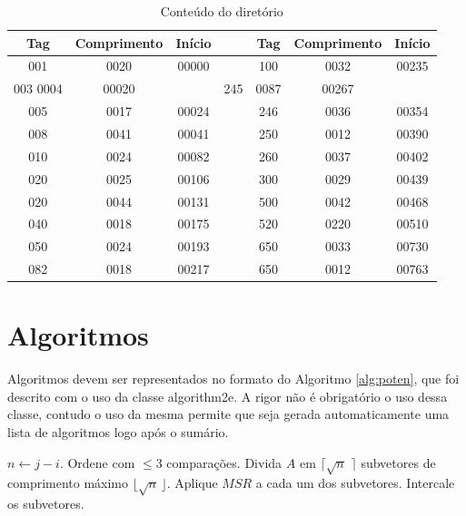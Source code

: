 \begin{table}[hp]
\centering
\caption{Conteúdo do diretório \cite{Mar2004} }
\label{tab:MarcMNem} 
\begin{tabular}{|c|c|c|c|c|c|c|}
\hline Tag & Comprimento & Início &   & Tag & Comprimento & Início \\ 
\hline 001 & 0020 & 00000 && 100 & 0032 & 00235\\ 
\hline 003  0004 & 00020 && 245 & 0087 & 00267\\ 
\hline 005 & 0017 & 00024 && 246 & 0036 & 00354\\ 
\hline 008 & 0041 & 00041 && 250 & 0012 & 00390\\ 
\hline 010 & 0024 & 00082 && 260 & 0037 & 00402\\ 
\hline 020 & 0025 & 00106 && 300 & 0029 & 00439\\ 
\hline 020 & 0044 & 00131 && 500 & 0042 & 00468\\ 
\hline 040 & 0018 & 00175 && 520 & 0220 & 00510\\ 
\hline 050 & 0024 & 00193 && 650 & 0033 & 00730\\ 
\hline 082 & 0018 & 00217 && 650 & 0012 & 00763\\ 
\hline 
\end{tabular} 
\end{table}

\section{Algoritmos}
\label{sec:algor} 
Algoritmos devem ser representados no formato do Algoritmo \ref{alg:poten}, que foi descrito com o uso da classe \textsf{algorithm2e}. A rigor não é obrigatório o uso dessa classe, contudo o uso da mesma permite que seja gerada automaticamente uma lista de algoritmos logo após o sumário.

\medskip
\begin{center}
\begin{minipage}{0.92\textwidth}
\begin{algorithm2e}[H]
 \DontPrintSemicolon
 \LinesNumbered
 \SetAlgoLined
 \BlankLine
 \BlankLine
 $n \leftarrow j - i$.\;
   {Ordene com $\leq 3$ comparações.}
   {Divida $A$ em $\lceil\sqrt{n}\,\,\rceil$ subvetores de comprimento máximo $\lfloor\sqrt{n}\,\rfloor$.\;
    Aplique $MSR$ a cada um dos subvetores.\;
    Intercale os subvetores.\;}
\caption{$MSR(A,i,j)$ \label {alg:poten}}
\end{algorithm2e}
\end{minipage}
\end{center}

